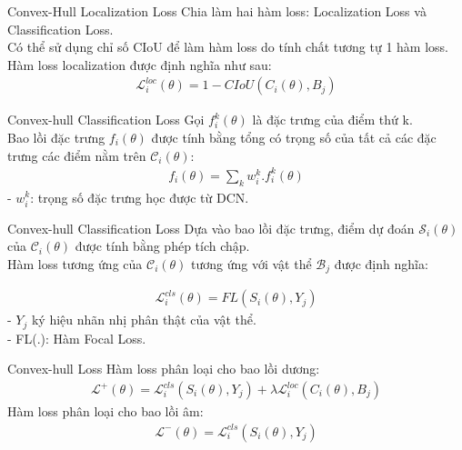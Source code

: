 \documentclass[11pt]{beamer}
\theoremstyle{definition}
\theoremstyle{plain}
\theoremstyle{plain}
\theoremstyle{remark}
\begin{document}
	
	\begin{frame}{Convex-Hull Localization Loss}
		Chia làm hai hàm loss: Localization Loss và Classification Loss.\\
		Có thể sử dụng chỉ số CIoU để làm hàm loss do tính chất tương tự 1 hàm loss.\\
		Hàm loss localization được định nghĩa như sau:
		\begin{align} \label{ptdd0}
			\mathcal{L}_i^{loc} (\theta) = 1 - CIoU(C_i(\theta), B_j)
		\end{align}
		
	\end{frame}
	
	
	\begin{frame}{Convex-hull Classification Loss}
		Gọi $f^k_i{(\theta)}$ là đặc trưng của điểm thứ k.\\
		Bao lồi đặc trưng $f_i{(\theta)}$ được tính bằng tổng có trọng số của tất cả các đặc trưng các điểm nằm trên $\mathcal{C}_i{(\theta)}$:
		\begin{align} \label{weight_sumation_of_all_feature_of_point}
			f_i{(\theta)} = \sum_k w_i^k . f^k_i{(\theta)}
		\end{align}
		- $w_i^k$: trọng số đặc trưng học được từ DCN.
		
	\end{frame}
	\begin{frame}{Convex-hull Classification Loss}
		Dựa vào bao lồi đặc trưng, điểm dự đoán $\mathcal{S}_i{(\theta)}$ của $\mathcal{C}_i{(\theta)}$ được tính bằng phép tích chập.\\
		Hàm loss tương ứng của $\mathcal{C}_i{(\theta)}$ tương ứng với vật thể $\mathcal{B}_j$ được định nghĩa:
		
		\begin{align} \label{ptdd1}
			\mathcal{L}	_i^{cls} (\theta) =FL(S_i(\theta), Y_j) 
		\end{align}
		- $Y_j$ ký hiệu nhãn nhị phân thật của vật thể.\\
		- FL(.): Hàm Focal Loss.
	\end{frame}
	\begin{frame}{Convex-hull Loss}
		Hàm loss phân loại cho bao lồi dương:\\
		\begin{align} \label{ptdd2}
			\mathcal{L}^+ (\theta) = 	\mathcal{L}_i^{cls}(S_i(\theta), Y_j) +\lambda 	\mathcal{L}_i^{loc}(C_i(\theta), B_j)
		\end{align}
		Hàm loss phân loại cho bao lồi âm:\\
		\begin{align} \label{ptdd3}
			\mathcal{L}^- (\theta) = \mathcal{L}_i^{cls}(S_i(\theta), Y_j) 
		\end{align}
		
	\end{frame}
\end{document}
